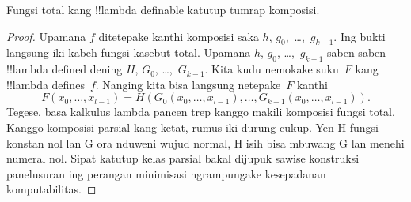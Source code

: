 \documentclass[../../../include/open-logic-section]{subfiles}
\begin{document}

\begin{lem}
Fungsi total kang !!{lambda definable}
katutup tumrap komposisi.
\end{lem}

\begin{proof}
Upamana $f$ ditetepake kanthi komposisi
saka $h$, $g_0,$ \dots,~$g_{k-1}$.
Ing bukti langsung iki kabeh fungsi kasebut total. Upamana $h$, $g_0$, \dots,~$g_{k-1}$
saben-saben !!{lambda defined} dening
$H$, $G_0$, \dots,~$G_{k-1}$.
Kita kudu nemokake suku~$F$ kang
!!{lambda define}s~$f$. Nanging kita
bisa langsung netepake~$F$ kanthi
\[
F(x_0, \dots, x_{l-1}) = H(G_0(x_0, \dots, x_{l-1}),
\dots, G_{k-1}(x_0, \dots, x_{l-1})).
\]
Tegese, basa kalkulus lambda pancen trep
kanggo makili komposisi fungsi total. Kanggo komposisi parsial kang ketat, rumus iki durung cukup. Yen H fungsi konstan nol lan G ora nduweni wujud normal, H isih bisa mbuwang G lan menehi numeral nol. Sipat katutup kelas parsial bakal dijupuk sawise konstruksi panelusuran ing perangan minimisasi ngrampungake kesepadanan komputabilitas.
\end{proof}
\end{document}
